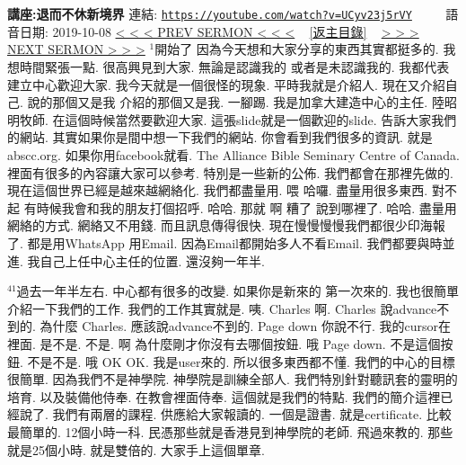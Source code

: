 \documentclass{book}
\begin{document}
\newpage



\section{}
\label{sec:UCyv23j5rVY}
\textbf{講座:退而不休新境界}
\newline
\newline
連結: \href{https://youtube.com/watch?v=UCyv23j5rVY}{\texttt{https://youtube.com/watch?v=UCyv23j5rVY}} ~~~~ 語音日期: 2019-10-08
\newline
\newline
\hyperref[sec:code]{\small{< < < PREV SERMON < < <}}
~
\hyperref[sec:index]{\small{[返主目錄]}}
~
\hyperref[sec:JwFqk5bcKhM]{\small{> > > NEXT SERMON > > >}}
\newline
\newline
$^{1}$開始了 因為今天想和大家分享的東西其實都挺多的.
我想時間緊張一點.
很高興見到大家.
無論是認識我的 或者是未認識我的.
我都代表建立中心歡迎大家.
我今天就是一個很怪的現象.
平時我就是介紹人.
現在又介紹自己.
說的那個又是我 介紹的那個又是我.
一腳踢.
我是加拿大建造中心的主任.
陸昭明牧師.
在這個時候當然要歡迎大家.
這張slide就是一個歡迎的slide.
告訴大家我們的網站.
其實如果你是間中想一下我們的網站.
你會看到我們很多的資訊.
就是abscc.org.
如果你用facebook就看.
The Alliance Bible Seminary Centre of Canada.
裡面有很多的內容讓大家可以參考.
特別是一些新的公佈.
我們都會在那裡先做的.
現在這個世界已經是越來越網絡化.
我們都盡量用.
喂 哈囉.
盡量用很多東西.
對不起 有時候我會和我的朋友打個招呼.
哈哈.
那就 啊 糟了 說到哪裡了.
哈哈.
盡量用網絡的方式.
網絡又不用錢.
而且訊息傳得很快.
現在慢慢慢慢我們都很少印海報了.
都是用WhatsApp 用Email.
因為Email都開始多人不看Email.
我們都要與時並進.
我自己上任中心主任的位置.
還沒夠一年半.

$^{41}$過去一年半左右.
中心都有很多的改變.
如果你是新來的 第一次來的.
我也很簡單介紹一下我們的工作.
我們的工作其實就是.
咦.
Charles 啊.
Charles 說advance不到的.
為什麼 Charles.
應該說advance不到的.
Page down 你說不行.
我的cursor在裡面.
是不是.
不是.
啊 為什麼剛才你沒有去哪個按鈕.
哦 Page down.
不是這個按鈕.
不是不是.
哦 OK OK.
我是user來的.
所以很多東西都不懂.
我們的中心的目標很簡單.
因為我們不是神學院.
神學院是訓練全部人.
我們特別針對聽訊套的靈明的培育.
以及裝備他侍奉.
在教會裡面侍奉.
這個就是我們的特點.
我們的簡介這裡已經說了.
我們有兩層的課程.
供應給大家報讀的.
一個是證書.
就是certificate.
比較最簡單的.
12個小時一科.
民憑那些就是香港見到神學院的老師.
飛過來教的.
那些就是25個小時.
就是雙倍的.
大家手上這個單章.
\end{document}
